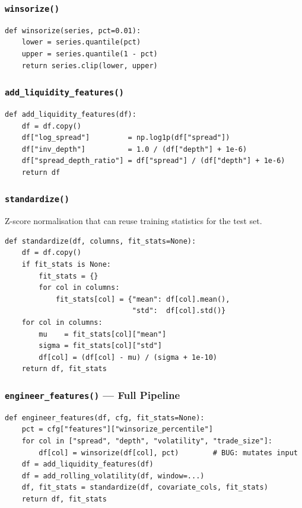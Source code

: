 \documentclass[11pt, letterpaper]{article}
\begin{document}
\subsubsection{\texttt{winsorize()}}
\begin{lstlisting}[caption={Winsorisation: clip extreme values at tail percentiles.}]
def winsorize(series, pct=0.01):
    lower = series.quantile(pct)
    upper = series.quantile(1 - pct)
    return series.clip(lower, upper)
\end{lstlisting}

\subsubsection{\texttt{add\_liquidity\_features()}}
\begin{lstlisting}[caption={Derived liquidity proxies.}]
def add_liquidity_features(df):
    df = df.copy()
    df["log_spread"]         = np.log1p(df["spread"])
    df["inv_depth"]          = 1.0 / (df["depth"] + 1e-6)
    df["spread_depth_ratio"] = df["spread"] / (df["depth"] + 1e-6)
    return df
\end{lstlisting}

\subsubsection{\texttt{standardize()}}
Z-score normalisation that can reuse training statistics for the test set.
\begin{lstlisting}[caption={Z-score standardisation with fit/transform pattern.}]
def standardize(df, columns, fit_stats=None):
    df = df.copy()
    if fit_stats is None:
        fit_stats = {}
        for col in columns:
            fit_stats[col] = {"mean": df[col].mean(),
                              "std":  df[col].std()}
    for col in columns:
        mu    = fit_stats[col]["mean"]
        sigma = fit_stats[col]["std"]
        df[col] = (df[col] - mu) / (sigma + 1e-10)
    return df, fit_stats
\end{lstlisting}

\subsubsection{\texttt{engineer\_features()} --- Full Pipeline}
\begin{lstlisting}[caption={Master feature engineering function (abbreviated).}]
def engineer_features(df, cfg, fit_stats=None):
    pct = cfg["features"]["winsorize_percentile"]
    for col in ["spread", "depth", "volatility", "trade_size"]:
        df[col] = winsorize(df[col], pct)        # BUG: mutates input
    df = add_liquidity_features(df)
    df = add_rolling_volatility(df, window=...)
    df, fit_stats = standardize(df, covariate_cols, fit_stats)
    return df, fit_stats
\end{lstlisting}
\end{document}
